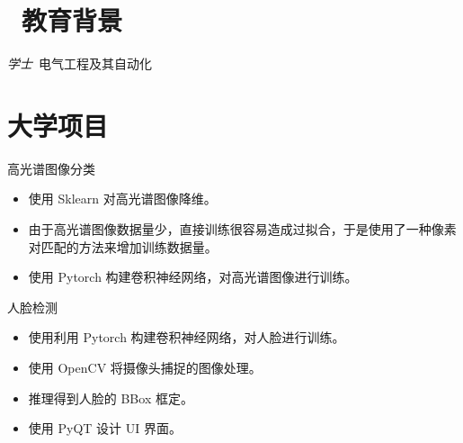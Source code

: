 \documentclass{resume}
\begin{document}

\section{\faGraduationCap\  教育背景}
\textit{学士}\ 电气工程及其自动化
\section{大学项目}
\begin{onehalfspacing}
高光谱图像分类
\begin{itemize}
  \item 使用 Sklearn 对高光谱图像降维。
  \item 由于高光谱图像数据量少，直接训练很容易造成过拟合，于是使用了一种像素对匹配的方法来增加训练数据量。
  \item 使用 Pytorch 构建卷积神经网络，对高光谱图像进行训练。
\end{itemize}
\end{onehalfspacing}
\begin{onehalfspacing}
人脸检测
\begin{itemize}
  \item 使用利用 Pytorch 构建卷积神经网络，对人脸进行训练。
  \item 使用 OpenCV 将摄像头捕捉的图像处理。
  \item 推理得到人脸的 BBox 框定。
  \item 使用 PyQT 设计 UI 界面。
\end{itemize}
\end{onehalfspacing}

\end{document}
